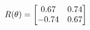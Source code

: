 \documentclass[preview]{standalone}
\begin{document}
\begin{align*}
\special{dvisvgm:raw <g id='unique000'>}R(\theta) = \begin{bmatrix}0.67 & 0.74\\-0.74 & 0.67\end{bmatrix}\special{dvisvgm:raw </g>}
\end{align*}
\end{document}
